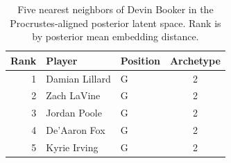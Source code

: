 \begin{table}[htbp]
  \centering\small
  \begin{tabular}{rllc}
    \toprule
    Rank & Player & Position & Archetype \\
    \midrule
    1 & Damian Lillard & G & 2 \\
    2 & Zach LaVine & G & 2 \\
    3 & Jordan Poole & G & 2 \\
    4 & De'Aaron Fox & G & 2 \\
    5 & Kyrie Irving & G & 2 \\
    \bottomrule
  \end{tabular}
  \caption{Five nearest neighbors of Devin Booker in the Procrustes-aligned posterior latent space. Rank is by posterior mean embedding distance.}
  \label{tab:Devin_Booker_neighbors}
\end{table}

